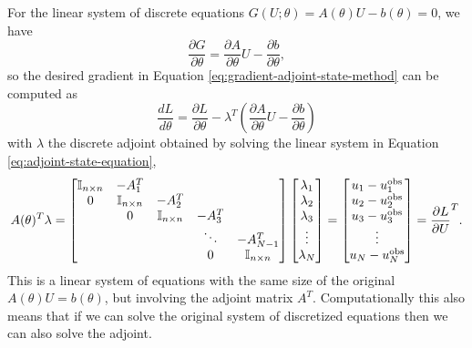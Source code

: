 For the linear system of discrete equations $G(U; \theta)=A(\theta) U - b(\theta)=0$, we have \cite{Johnson}
\begin{equation}
    \frac{\partial G}{\partial \theta} 
    = 
    \frac{\partial A }{\partial \theta} U - \frac{\partial b}{\partial \theta},
\end{equation}
so the desired gradient in Equation \eqref{eq:gradient-adjoint-state-method} can be computed as 
\begin{equation}
    \frac{dL}{d\theta} 
    = 
    \frac{\partial L}{\partial \theta} 
    - 
    \lambda^T \left( \frac{\partial A }{\partial \theta} U - \frac{\partial b}{\partial \theta} \right)
    \label{eq:dhdtheta_linear}
\end{equation}
with $\lambda$ the discrete adjoint obtained by solving the linear system in Equation \eqref{eq:adjoint-state-equation},
\begin{equation}
    A(\theta)^T \lambda 
    =
    \begin{bmatrix}
        \operatorname{\mathbb{I}}_{n \times n} & -A_1^T &   &  & \\
        0 & \operatorname{\mathbb{I}}_{n \times n} & -A_2^T &  &  \\
          & 0 & \operatorname{\mathbb{I}}_{n \times n} & -A_3^T &  \\
         &  &   & \ddots & -A_{N-1}^T  \\
         &  &  & 0 & \operatorname{\mathbb{I}}_{n \times n}
    \end{bmatrix}
    \begin{bmatrix}
        \lambda_1 \\
        \lambda_2 \\
        \lambda_3 \\
        \vdots \\
        \lambda_N
    \end{bmatrix}
    = 
    \begin{bmatrix}
        u_1 - u_1^\text{obs} \\
        u_2 - u_2^\text{obs} \\
        u_3 - u_3^\text{obs} \\
        \vdots \\
        u_N - u_N^\text{obs}     
    \end{bmatrix}
    = 
    \frac{\partial L}{\partial U}^T.
    \label{eq:linea-adjoint-state-equation}
\end{equation}
This is a linear system of equations with the same size of the original $A(\theta) U = b(\theta)$, but involving the adjoint matrix $A^T$. 
Computationally this also means that if we can solve the original system of discretized equations then we can also solve the adjoint. 
